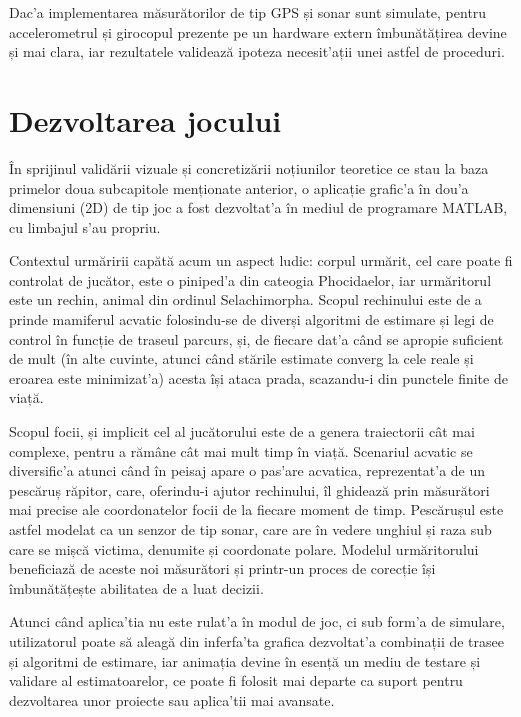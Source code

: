 \documentclass[12pt,a4paper,twoside]{report}
\begin{document}
\vspace{5px}

Dac'a implementarea măsurătorilor de tip GPS și sonar sunt simulate, pentru accelerometrul și girocopul prezente pe un hardware extern îmbunătățirea devine și mai clara, iar rezultatele validează ipoteza necesit'ații unei astfel de proceduri.

\section{Dezvoltarea jocului}

În sprijinul validării vizuale și concretizării noțiunilor teoretice ce stau la baza primelor doua subcapitole menționate anterior, o aplicație grafic'a în dou'a dimensiuni (2D) de tip joc a fost dezvoltat'a în mediul de programare MATLAB, cu limbajul s'au propriu.

\vspace{5px}

Contextul urmăririi capătă acum un aspect ludic: corpul urmărit, cel care poate fi controlat de jucător, este o piniped'a din cateogia Phocidaelor, iar urmăritorul este un rechin, animal din ordinul Selachimorpha. Scopul rechinului este de a prinde mamiferul acvatic folosindu-se de diverși algoritmi de estimare și legi de control în funcție de traseul parcurs, și, de fiecare dat'a când se apropie suficient de mult (în alte cuvinte, atunci când stările estimate converg la cele reale și eroarea este minimizat'a) acesta își ataca prada, scazandu-i din punctele finite de viață. 

\vspace{5px}

Scopul focii, și implicit cel al jucătorului este de a genera traiectorii cât mai complexe, pentru a rămâne cât mai mult timp în viață. Scenariul acvatic se diversific'a atunci când în peisaj apare o pas'are acvatica, reprezentat'a de un pescăruș răpitor, care, oferindu-i ajutor rechinului, îl ghidează prin măsurători mai precise ale coordonatelor focii de la fiecare moment de timp. Pescărușul este astfel modelat ca un senzor de tip sonar, care are în vedere unghiul și raza sub care se mișcă victima, denumite și coordonate polare. Modelul urmăritorului beneficiază de aceste noi măsurători și printr-un proces de corecție își îmbunătățește abilitatea de a luat decizii.  

\vspace{5px}

Atunci când aplica'tia nu este rulat'a în modul de joc, ci sub form'a de simulare, utilizatorul poate să aleagă din inferfa'ta grafica dezvoltat'a combinații de trasee și algoritmi de estimare, iar animația devine în esență un mediu de testare și validare al estimatoarelor, ce poate fi folosit mai departe ca suport pentru dezvoltarea unor proiecte sau aplica'tii mai avansate.
\end{document}
